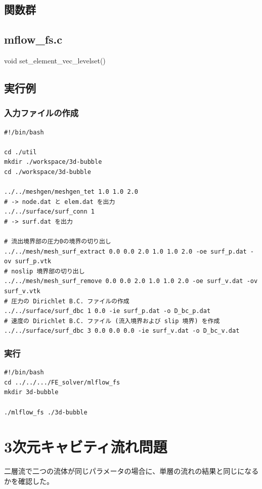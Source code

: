 \documentclass[8pt,a4paper]{article}
\begin{document}
\subsection{関数群}
\subsection*{mflow\_fs.c}

void set\_element\_vec\_levelset()

\subsection{実行例}
\subsubsection{入力ファイルの作成}
\begin{lstlisting}[]
#!/bin/bash

cd ./util
mkdir ./workspace/3d-bubble
cd ./workspace/3d-bubble

../../meshgen/meshgen_tet 1.0 1.0 2.0
# -> node.dat と elem.dat を出力
../../surface/surf_conn 1
# -> surf.dat を出力

# 流出境界部の圧力0の境界の切り出し
../../mesh/mesh_surf_extract 0.0 0.0 2.0 1.0 1.0 2.0 -oe surf_p.dat -ov surf_p.vtk
# noslip 境界部の切り出し
../../mesh/mesh_surf_remove 0.0 0.0 2.0 1.0 1.0 2.0 -oe surf_v.dat -ov surf_v.vtk
# 圧力の Dirichlet B.C. ファイルの作成
../../surface/surf_dbc 1 0.0 -ie surf_p.dat -o D_bc_p.dat
# 速度の Dirichlet B.C. ファイル (流入境界および slip 境界) を作成
../../surface/surf_dbc 3 0.0 0.0 0.0 -ie surf_v.dat -o D_bc_v.dat
\end{lstlisting}

\subsubsection{実行}
\begin{lstlisting}[]
#!/bin/bash
cd ../../.../FE_solver/mlflow_fs
mkdir 3d-bubble

./mlflow_fs ./3d-bubble
\end{lstlisting}


\newpage
\section{3次元キャビティ流れ問題}
二層流で二つの流体が同じパラメータの場合に、単層の流れの結果と同じになるかを確認した。
\end{document}
